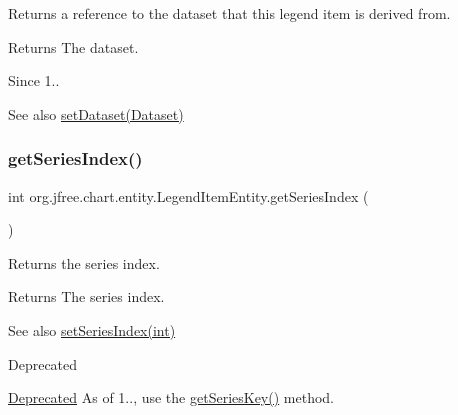 Returns a reference to the dataset that this legend item is derived from.

\begin{DoxyReturn}{Returns}
The dataset.
\end{DoxyReturn}
\begin{DoxySince}{Since}
1..
\end{DoxySince}
\begin{DoxySeeAlso}{See also}
\mbox{\hyperlink{classorg_1_1jfree_1_1chart_1_1entity_1_1_legend_item_entity_aa00af89c7866832e592a4fef40785db3}{set\+Dataset(\+Dataset)}} 
\end{DoxySeeAlso}
\mbox{\label{classorg_1_1jfree_1_1chart_1_1entity_1_1_legend_item_entity_ab37af6a271e6d5d48afd0ff80a5a440d}} 
\subsubsection{\texorpdfstring{get\+Series\+Index()}{getSeriesIndex()}}
{\footnotesize\ttfamily int org.\+jfree.\+chart.\+entity.\+Legend\+Item\+Entity.\+get\+Series\+Index (\begin{DoxyParamCaption}{ }\end{DoxyParamCaption})}

Returns the series index.

\begin{DoxyReturn}{Returns}
The series index.
\end{DoxyReturn}
\begin{DoxySeeAlso}{See also}
\mbox{\hyperlink{classorg_1_1jfree_1_1chart_1_1entity_1_1_legend_item_entity_ab4fa4fb654292b30900965b21e4f904b}{set\+Series\+Index(int)}}
\end{DoxySeeAlso}
\begin{DoxyRefDesc}{Deprecated}
\item[\mbox{\hyperlink{deprecated__deprecated000048}{Deprecated}}]As of 1.., use the \mbox{\hyperlink{classorg_1_1jfree_1_1chart_1_1entity_1_1_legend_item_entity_adcd94e383c12091bc60065e4f73bac2a}{get\+Series\+Key()}} method. \end{DoxyRefDesc}
\mbox{\label{classorg_1_1jfree_1_1chart_1_1entity_1_1_legend_item_entity_adcd94e383c12091bc60065e4f73bac2a}} 
